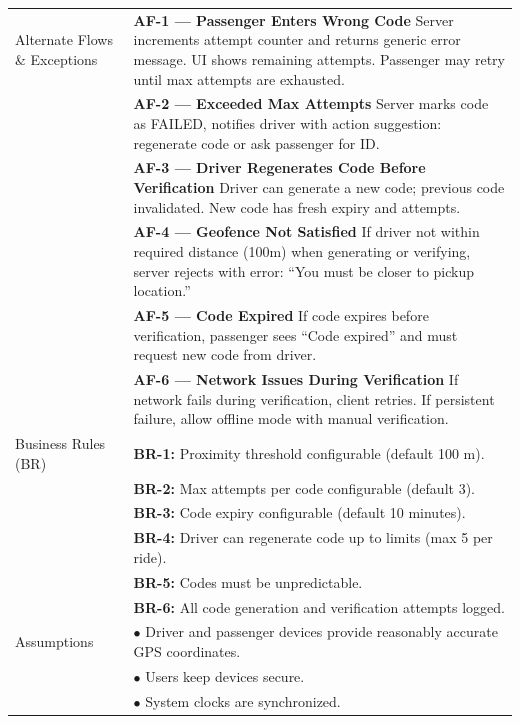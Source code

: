 \begin{longtable}{|>{\raggedright\arraybackslash}p{4cm}|>{\raggedright\arraybackslash}p{11cm}|}
\hline
Alternate Flows \& Exceptions & \textbf{AF-1 — Passenger Enters Wrong Code} \newline Server increments attempt counter and returns generic error message. UI shows remaining attempts. Passenger may retry until max attempts are exhausted. \\
& \textbf{AF-2 — Exceeded Max Attempts} \newline Server marks code as FAILED, notifies driver with action suggestion: regenerate code or ask passenger for ID. \\
& \textbf{AF-3 — Driver Regenerates Code Before Verification} \newline Driver can generate a new code; previous code invalidated. New code has fresh expiry and attempts. \\
& \textbf{AF-4 — Geofence Not Satisfied} \newline If driver not within required distance (100m) when generating or verifying, server rejects with error: ``You must be closer to pickup location.'' \\
& \textbf{AF-5 — Code Expired} \newline If code expires before verification, passenger sees ``Code expired'' and must request new code from driver. \\
& \textbf{AF-6 — Network Issues During Verification} \newline If network fails during verification, client retries. If persistent failure, allow offline mode with manual verification. \\
\hline
Business Rules (BR) & \textbf{BR-1:} Proximity threshold configurable (default 100 m). \\
& \textbf{BR-2:} Max attempts per code configurable (default 3). \\
& \textbf{BR-3:} Code expiry configurable (default 10 minutes). \\
& \textbf{BR-4:} Driver can regenerate code up to limits (max 5 per ride). \\
& \textbf{BR-5:} Codes must be unpredictable. \\
& \textbf{BR-6:} All code generation and verification attempts logged. \\
\hline
Assumptions & $\bullet$ Driver and passenger devices provide reasonably accurate GPS coordinates. \\
& $\bullet$ Users keep devices secure. \\
& $\bullet$ System clocks are synchronized. \\
\hline
\end{longtable}

